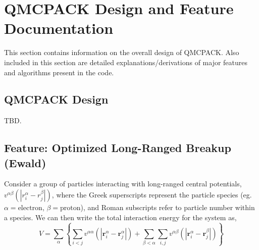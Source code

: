 \chapter{QMCPACK Design and Feature Documentation}
\label{chap:design_features}

This section contains information on the overall design of QMCPACK.  Also included in this section are detailed explanations/derivations of major features and algorithms present in the code.


\section{QMCPACK Design}
TBD.



\newpage
\section{Feature: Optimized Long-Ranged Breakup (Ewald)}


Consider a group of particles interacting with long-ranged central
potentials, $v^{\alpha \beta}(|r^{\alpha}_i - r^{\beta}_j|)$, where the Greek superscripts
represent the particle species (eg. $\alpha=\text{electron}$,
$\beta=\text{proton}$), and Roman subscripts refer to particle number
within a species.  We can then write the total interaction energy for
the system as,
\newcommand{\vr}{\mathbf{r}}
\newcommand{\vR}{\mathbf{R}}
\newcommand{\vk}{\mathbf{k}}
\newcommand{\vq}{\mathbf{q}}
\begin{equation}
V = \sum_\alpha \left\{\sum_{i<j} v^{\alpha\alpha}(|\vr^\alpha_i - \vr^\alpha_j|) +
\sum_{\beta<\alpha} 
\sum_{i,j} v^{\alpha \beta}(|\vr^{\alpha}_i - \vr^{\beta}_j|) \right\}
\label{eq:Vperiodic}
\end{equation}
\newcommand{\va}{\mathbf{a}}
\newcommand{\vb}{\mathbf{b}}
\newcommand{\vL}{\mathbf{L}}

